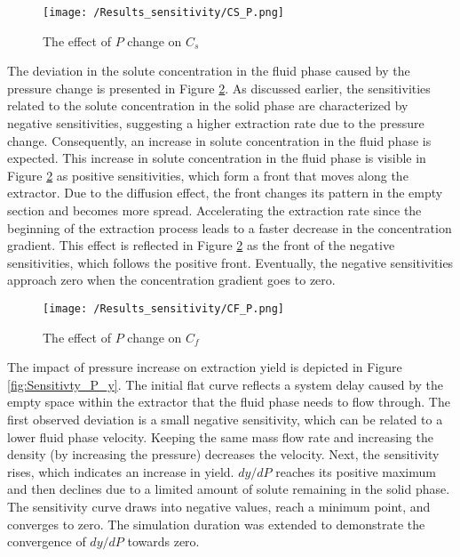 \documentclass[../Article_Sensitivity_Analsysis.tex]{subfiles}
\begin{document}
	\begin{figure}[h!]
		\centering
		\texttt{[image: /Results\_sensitivity/CS\_P.png]}
		\caption{The effect of $P$ change on $C_s$}
		\label{fig:Sensitivty_P_CS}
	\end{figure}

	The deviation in the solute concentration in the fluid phase caused by the pressure change is presented in Figure \ref{fig:Sensitivty_P_CF}. As discussed earlier, the sensitivities related to the solute concentration in the solid phase are characterized by negative sensitivities, suggesting a higher extraction rate due to the pressure change. Consequently, an increase in solute concentration in the fluid phase is expected. This increase in solute concentration in the fluid phase is visible in Figure \ref{fig:Sensitivty_P_CF} as positive sensitivities, which form a front that moves along the extractor. Due to the diffusion effect, the front changes its pattern in the empty section and becomes more spread. Accelerating the extraction rate since the beginning of the extraction process leads to a faster decrease in the concentration gradient. This effect is reflected in Figure \ref{fig:Sensitivty_P_CF} as the front of the negative sensitivities, which follows the positive front. Eventually, the negative sensitivities approach zero when the concentration gradient goes to zero.

	\begin{figure}[h!]
		\centering
		\texttt{[image: /Results\_sensitivity/CF\_P.png]}
		\caption{The effect of $P$ change on $C_f$}
		\label{fig:Sensitivty_P_CF}
	\end{figure}

	The impact of pressure increase on extraction yield is depicted in Figure \ref{fig:Sensitivty_P_y}. The initial flat curve reflects a system delay caused by the empty space within the extractor that the fluid phase needs to flow through. The first observed deviation is a small negative sensitivity, which can be related to a lower fluid phase velocity. Keeping the same mass flow rate and increasing the density (by increasing the pressure) decreases the velocity. Next, the sensitivity rises, which indicates an increase in yield. $dy / dP$ reaches its positive maximum and then declines due to a limited amount of solute remaining in the solid phase. The sensitivity curve draws into negative values, reach a minimum point, and converges to zero. The simulation duration was extended to demonstrate the convergence of $dy / dP$ towards zero.
\end{document}
